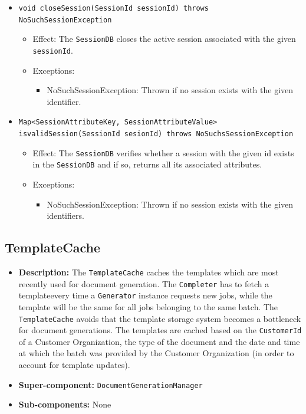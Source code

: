 \documentclass[a4paper,10pt]{article}
\begin{document}
\begin{itemize}
\begin{itemize}
        \item \texttt{void closeSession(SessionId sessionId) throws NoSuchSessionException}
        \begin{itemize}
             \item Effect: The \texttt{SessionDB} closes the active session associated with the given \texttt{sessionId}.
             \item Exceptions:
             \begin{itemize}
                \item NoSuchSessionException: Thrown if no session exists with the given identifier.
             \end{itemize}   
        \end{itemize}   
        
        \item \texttt{Map<SessionAttributeKey, SessionAttributeValue> isvalidSession(SessionId sesionId) throws NoSuchsSessionException}
        \begin{itemize}
            \item Effect: The \texttt{SessionDB} verifies whether a session with the given id exists in the \texttt{SessionDB} and if so, returns all its associated attributes.
            \item Exceptions:
            \begin{itemize}
                \item NoSuchSessionException: Thrown if no session exists with the given identifiers.
             \end{itemize}
        \end{itemize}   
    \end{itemize}
\end{itemize}


\subsection{TemplateCache}
\begin{itemize}
    \item \textbf{Description:}  The \texttt{TemplateCache} caches the templates which are most recently used for document generation. The \texttt{Completer} has to fetch a templateevery time a \texttt{Generator} instance requests new jobs, while the template will be the same for all jobs belonging to the same batch. The \texttt{TemplateCache} avoids that the template storage system becomes a bottleneck for document generations. The templates are cached based on the \texttt{CustomerId} of a Customer Organization, the type of the document and the date and time at which the batch was provided by the Customer Organization (in order to account for template updates).
    \item \textbf{Super-component:} \texttt{DocumentGenerationManager}
    \item \textbf{Sub-components:} None
\end{itemize}
\end{document}
